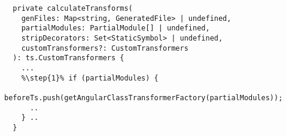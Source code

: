 \begin{verbatim}
  private calculateTransforms(
    genFiles: Map<string, GeneratedFile> | undefined,
    partialModules: PartialModule[] | undefined,
    stripDecorators: Set<StaticSymbol> | undefined,
    customTransformers?: CustomTransformers
  ): ts.CustomTransformers {
    ...
    %\step{1}% if (partialModules) {
      beforeTs.push(getAngularClassTransformerFactory(partialModules));
      ..
    } ..
  }
\end{verbatim}
